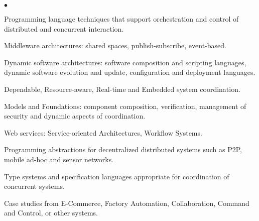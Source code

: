 \documentclass[11pt]{article}
\newenvironment{tightlist}{\begin{list}{$\bullet$}{
  \setlength{\itemsep}{0mm}
  \setlength{\parsep}{0mm}
}}{\end{list}}
\begin{document}
\begin{tightlist}
\item Programming language techniques that support orchestration and control
    of distributed and concurrent interaction.
\item Middleware architectures: shared spaces, publish-subscribe, event-based.
\item Dynamic software architectures: software composition and scripting
    languages, dynamic software evolution and update, configuration and
    deployment languages.
\item Dependable, Resource-aware, Real-time and Embedded system coordination.
\item Models and Foundations: component composition, verification, management
    of security and dynamic aspects of coordination.
\item Web services: Service-oriented Architectures, Workflow Systems.
\item Programming abstractions for decentralized distributed systems such as
    P2P, mobile ad-hoc and sensor networks.
\item Type systems and specification languages appropriate for coordination of
    concurrent systems.
\item Case studies from E-Commerce, Factory Automation, Collaboration, Command
    and Control, or other systems.
\end{tightlist}
\end{document}
